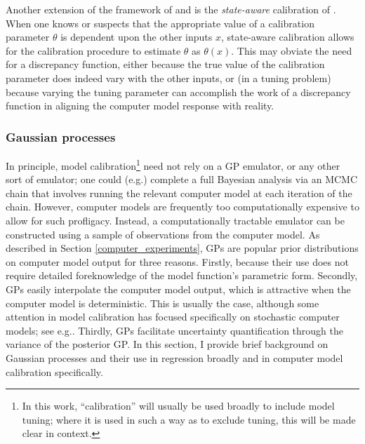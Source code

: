 \documentclass{article}
\begin{document}
Another extension of the framework of \cite{Kennedy2001} and \cite{Bayarri2007} is the \emph{state-aware} calibration of \cite{Brown2016}. When one knows or suspects that the appropriate value of a calibration parameter $\theta$ is dependent upon the other inputs $x$, state-aware calibration allows for the calibration procedure to estimate $\theta$ as $\theta(x)$. This may obviate the need for a discrepancy function, either because the true value of the calibration parameter does indeed vary with the other inputs, or (in a tuning problem) because varying the tuning parameter can accomplish the work of a discrepancy function in aligning the computer model response with reality.

\subsubsection{Gaussian processes} \label{gaussian_processes}

In principle, model calibration\footnote{In this work, ``calibration'' will usually be used broadly to include model tuning; where it is used in such a way as to exclude tuning, this will be made clear in context.}
need not rely on a GP emulator, or any other sort of emulator; one could (e.g.) complete a full Bayesian analysis via an MCMC chain that involves running the relevant computer model at each iteration of the chain. However, computer models are frequently too computationally expensive to allow for such profligacy. Instead, a computationally tractable emulator can be constructed using a sample of observations from the computer model. As described in Section \ref{computer_experiments}, GPs are popular prior distributions on computer model output for three reasons. Firstly, because their use does not require detailed foreknowledge of the model function's parametric form. Secondly, GPs easily interpolate the computer model output, which is attractive when the computer model is deterministic. This is usually the case, although some attention in model calibration has focused specifically on stochastic computer models; see e.g.\cite{Pratola2018}. Thirdly, GPs facilitate uncertainty quantification through the variance of the posterior GP. In this section, I provide brief background on Gaussian processes and their use in regression broadly and in computer model calibration specifically.

\end{document}
